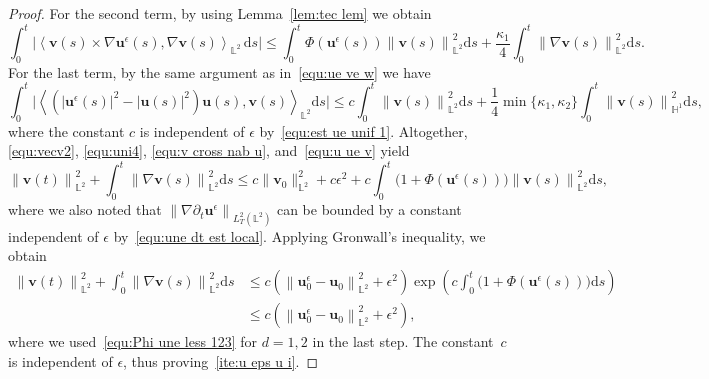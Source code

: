 \documentclass[11pt,reqno]{amsart}
\theoremstyle{definition}
\numberwithin{equation}{section}
\newcommand{\bff}{\boldsymbol}
\newcommand{\bb}{\mathbb}
\newcommand{\ds}{\mathrm{d}s}
\newcommand{\norm}[2]{\left\|{#1}\right\|_{#2}}
\newcommand{\inpro}[2]{\left\langle#1,#2\right\rangle}
\begin{document}
\begin{proof}
	For the second term, by using Lemma~\ref{lem:tec lem} we obtain
	\begin{equation}\label{equ:v cross nab u}
		\int_0^t 
		\Big|
		\inpro{\bff{v}(s)\times\nabla\bff{u}^\epsilon(s)}{\nabla\bff{v}(s)}_{\bb{L}^2}\,\ds
		\Big|
		\leq 
		\int_0^t \Phi(\bff{u}^\epsilon(s)) \norm{\bff{v}(s)}{\bb{L}^2}^2 \ds
		+
		\frac{\kappa_1}{4} \int_0^t \norm{\nabla \bff{v}(s)}{\bb{L}^2}^2 \ds.
	\end{equation}
	For the last term, by the same argument as in~\eqref{equ:ue ve w} we have
	\begin{equation}\label{equ:u ue v}
		\int_0^t 
		\Big|
		\inpro{(|\bff{u}^\epsilon(s)|^2-|\bff{u}(s)|^2)\bff{u}(s)}{\bff{v}(s)}_{\bb{L}^2} \ds
		\Big|
		\leq
		c \int_0^t \norm{\bff{v}(s)}{\bb{L}^2}^2 \ds 
		+
		\frac14 \min\{\kappa_1,\kappa_2\} \int_0^t \norm{\bff{v}(s)}{\bb{H}^1}^2 \ds,
	\end{equation}
	where the constant $c$ is independent of $\epsilon$ by~\eqref{equ:est ue unif
		1}. Altogether, \eqref{equ:vecv2}, \eqref{equ:uni4}, \eqref{equ:v cross nab u},
	and~\eqref{equ:u ue v} yield
	\begin{equation*}
		\norm{\bff{v}(t)}{\bb{L}^2}^2 
		+ \int_0^t \norm{\nabla \bff{v}(s)}{\bb{L}^2}^2 \ds 
		\leq
		c \|\bff{v}_0\|_{\bb{L}^2}^2
		+
		c\epsilon^2 
		+ 
		c\int_0^t \big(1+ \Phi(\bff{u}^\epsilon(s))\big) \norm{\bff{v}(s)}{\bb{L}^2}^2 \ds,
	\end{equation*}
	where we also noted that $\norm{\nabla\partial_t
		\bff{u}^\epsilon}{L^2_T(\bb{L}^2)}$ can be bounded by a constant independent of
	$\epsilon$ by~\eqref{equ:une dt est local}. Applying Gronwall's inequality, we obtain
	\begin{align*}
		\norm{\bff{v}(t)}{\bb{L}^2}^2
		+ \int_0^t \norm{\nabla \bff{v}(s)}{\bb{L}^2}^2 \ds 
		&\leq
		c \left(
		\norm{\bff{u}_0^\epsilon-\bff{u}_0}{\bb{L}^2}^2
		+
		\epsilon^2 
		\right)
		\exp\left(c \int_0^t \big(1+\Phi(\bff{u}^\epsilon(s))\big) \ds\right)
		\\
		&\leq
		c \left(
		\norm{\bff{u}_0^\epsilon-\bff{u}_0}{\bb{L}^2}^2
		+
		\epsilon^2 
		\right),
	\end{align*}
	where we used~\eqref{equ:Phi une less 123} for $d=1,2$ in the last step. The constant~$c$ is
	independent of $\epsilon$, thus proving~\ref{ite:u eps u i}.
	

\end{proof}
\end{document}
